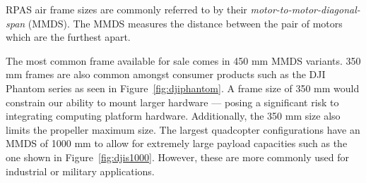 RPAS air frame sizes are commonly referred to by their \textit{motor-to-motor-diagonal-span} (MMDS). The MMDS measures the distance between the pair of motors which are the furthest apart. 

The most common frame available for sale comes in 450 mm MMDS variants. 350 mm frames are also common amongst consumer products such as the DJI Phantom series\cite{dji-phantom-3-specs} as seen in Figure~\ref{fig:djiphantom}. A frame size of 350 mm would constrain our ability to mount larger hardware --- posing a significant risk to integrating computing platform hardware. Additionally, the 350 mm size also limits the propeller maximum size. The largest quadcopter configurations have an MMDS of 1000 mm to allow for extremely large payload capacities such as the one shown in Figure~\ref{fig:djis1000}. However, these are more commonly used for industrial or military applications.

